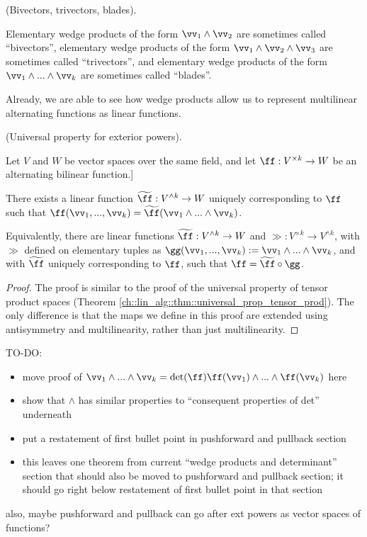 \begin{remark}
    (Bivectors, trivectors, blades).

    Elementary wedge products of the form $\vv_1 \wedge \vv_2$ are sometimes called ``bivectors'', elementary wedge products of the form $\vv_1 \wedge \vv_2 \wedge \vv_3$ are sometimes called ``trivectors'', and elementary wedge products of the form $\vv_1 \wedge ... \wedge \vv_k$ are sometimes called ``blades''.
\end{remark}

Already, we are able to see how wedge products allow us to represent multilinear alternating functions as linear functions.

\begin{theorem}
    (Universal property for exterior powers).
    
    Let $V$ and $W$ be vector spaces over the same field, and let $\ff:V^{\times k} \rightarrow W$ be an alternating bilinear function.]
    
    There exists a linear function $\widetilde{\ff}:V^{\wedge k} \rightarrow W$ uniquely corresponding to $\ff$ such that $\ff(\vv_1, ..., \vv_k) = \widetilde{\ff}(\vv_1 \wedge ... \wedge \vv_k)$.

    Equivalently, there are linear functions $\widetilde{\ff}:V^{\wedge k} \rightarrow W$ and $\gg:V^{\times k} \rightarrow V^{\wedge k}$, with $\gg$ defined on elementary tuples as $\gg(\vv_1, ..., \vv_k) := \vv_1 \wedge ... \wedge \vv_k$, and with $\widetilde{\ff}$ uniquely corresponding to $\ff$, such that $\ff = \widetilde{\ff} \circ \gg$.
\end{theorem}

\begin{proof}
    The proof is similar to the proof of the universal property of tensor product spaces (Theorem \ref{ch::lin_alg::thm::universal_prop_tensor_prod}). The only difference is that the maps we define in this proof are extended using antisymmetry and multilinearity, rather than just multilinearity.
\end{proof}

\begin{lemma}
    TO-DO:
    
    \begin{itemize}
        \item move proof of $\vv_1 \wedge ... \wedge \vv_k = \det(\ff) \ff(\vv_1) \wedge ... \wedge \ff(\vv_k)$ here
        \item show that $\wedge$ has similar properties to ``consequent properties of det'' underneath
        \item put a restatement of first bullet point in pushforward and pullback section
        \item this leaves one theorem from current ``wedge products and determinant'' section that should also be moved to pushforward and pullback section; it should go right below restatement of first bullet point in that section
    \end{itemize}

    also, maybe pushforward and pullback can go after ext powers as vector spaces of functions?
\end{lemma}

